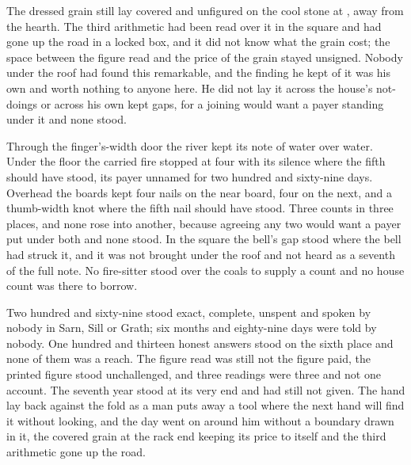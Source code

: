 The dressed grain still lay covered and unfigured on the cool stone at , away from the hearth. The third arithmetic had been read over it in the square and had gone up the road in a locked box, and it did not know what the grain cost; the space between the figure read and the price of the grain stayed unsigned. Nobody under the roof had found this remarkable, and the finding he kept of it was his own and worth nothing to anyone here. He did not lay it across the house's not-doings or across his own kept gaps, for a joining would want a payer standing under it and none stood.

Through the finger's-width door the river kept its note of water over water. Under the floor the carried fire stopped at four with its silence where the fifth should have stood, its payer unnamed for two hundred and sixty-nine days. Overhead the boards kept four nails on the near board, four on the next, and a thumb-width knot where the fifth nail should have stood. Three counts in three places, and none rose into another, because agreeing any two would want a payer put under both and none stood. In the square the bell's gap stood where the bell had struck it, and it was not brought under the roof and not heard as a seventh of the full note. No fire-sitter stood over the coals to supply a count and no house count was there to borrow.

Two hundred and sixty-nine stood exact, complete, unspent and spoken by nobody in Sarn, Sill or Grath; six months and eighty-nine days were told by nobody. One hundred and thirteen honest answers stood on the sixth place and none of them was a reach. The figure read was still not the figure paid, the printed figure stood unchallenged, and three readings were three and not one account. The seventh year stood at its very end and had still not given. The hand lay back against the fold as a man puts away a tool where the next hand will find it without looking, and the day went on around him without a boundary drawn in it, the covered grain at the rack end keeping its price to itself and the third arithmetic gone up the road.
